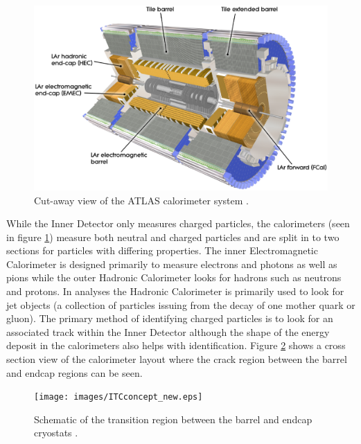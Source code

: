 		\begin{figure}[h!]
			\begin{center}
				\includegraphics[width=0.95\linewidth]{images/Calorimeter_d3.eps}
			\end{center}
			\caption{Cut-away view of the ATLAS calorimeter system \cite{Aad:1129811}.}
			\label{fig:ATLAS_calo}
		\end{figure}

		While the Inner Detector only measures charged particles, the calorimeters (seen in figure \ref{fig:ATLAS_calo}) measure both neutral and charged particles and are split in to two sections for particles with differing properties. The inner Electromagnetic Calorimeter is designed primarily to measure electrons and photons as well as pions while the outer Hadronic Calorimeter looks for hadrons such as neutrons and protons. In analyses the Hadronic Calorimeter is primarily used to look for jet objects (a collection of particles issuing from the decay of one mother quark or gluon). The primary method of identifying charged particles is to look for an associated track within the Inner Detector although the shape of the energy deposit in the calorimeters also helps with identification. Figure \ref{fig:ATLAS_calo_crack} shows a cross section view of the calorimeter layout where the crack region between the barrel and endcap regions can be seen.



		\begin{figure}[h!]
			\begin{center}
				\texttt{[image: images/ITCconcept\_new.eps]}
			\end{center}
			\caption{Schematic of the transition region between the barrel and endcap cryostats \cite{Aad:1129811}.}
			\label{fig:ATLAS_calo_crack}
		\end{figure}


